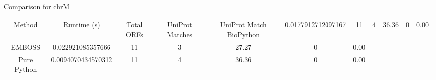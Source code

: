 Comparison for chrM
\begin{tabular}{ccccccc}
Method & Runtime (s) & Total ORFs & UniProt Matches & UniProt Match %
BioPython & 0.0177912712097167 & 11 & 4 & 36.36 & 0 & 0.00 \\
EMBOSS & 0.022921085357666 & 11 & 3 & 27.27 & 0 & 0.00 \\
Pure Python & 0.0094070434570312 & 11 & 4 & 36.36 & 0 & 0.00 \\
\end{tabular}